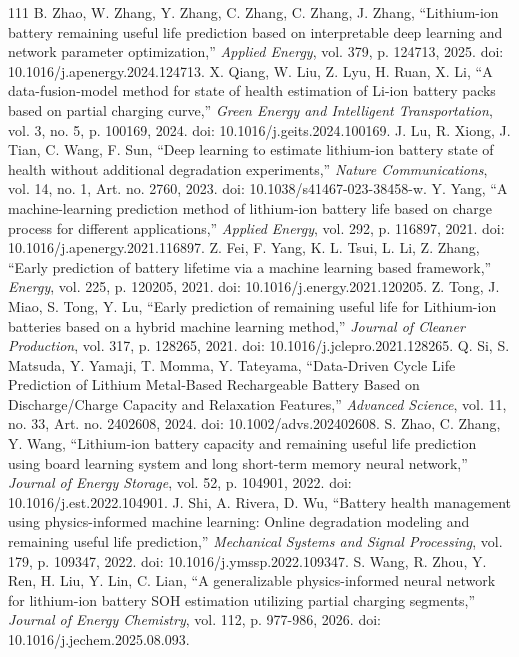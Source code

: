 \documentclass[journal]{IEEEtran}
\begin{document}
\begin{thebibliography}{111}
B. Zhao, W. Zhang, Y. Zhang, C. Zhang, C. Zhang, J. Zhang, ``Lithium-ion battery remaining useful life prediction based on interpretable deep learning and network parameter optimization,'' \emph{Applied Energy}, vol. 379, p. 124713, 2025. doi: 10.1016/j.apenergy.2024.124713.
X. Qiang, W. Liu, Z. Lyu, H. Ruan, X. Li, ``A data-fusion-model method for state of health estimation of Li-ion battery packs based on partial charging curve,'' \emph{Green Energy and Intelligent Transportation}, vol. 3, no. 5, p. 100169, 2024. doi: 10.1016/j.geits.2024.100169.
J. Lu, R. Xiong, J. Tian, C. Wang, F. Sun, ``Deep learning to estimate lithium-ion battery state of health without additional degradation experiments,'' \emph{Nature Communications}, vol. 14, no. 1, Art. no. 2760, 2023. doi: 10.1038/s41467-023-38458-w.
Y. Yang, ``A machine-learning prediction method of lithium-ion battery life based on charge process for different applications,'' \emph{Applied Energy}, vol. 292, p. 116897, 2021. doi: 10.1016/j.apenergy.2021.116897.
Z. Fei, F. Yang, K. L. Tsui, L. Li, Z. Zhang, ``Early prediction of battery lifetime via a machine learning based framework,'' \emph{Energy}, vol. 225, p. 120205, 2021. doi: 10.1016/j.energy.2021.120205.
Z. Tong, J. Miao, S. Tong, Y. Lu, ``Early prediction of remaining useful life for Lithium-ion batteries based on a hybrid machine learning method,'' \emph{Journal of Cleaner Production}, vol. 317, p. 128265, 2021. doi: 10.1016/j.jclepro.2021.128265.
Q. Si, S. Matsuda, Y. Yamaji, T. Momma, Y. Tateyama, ``Data‐Driven Cycle Life Prediction of Lithium Metal‐Based Rechargeable Battery Based on Discharge/Charge Capacity and Relaxation Features,'' \emph{Advanced Science}, vol. 11, no. 33, Art. no. 2402608, 2024. doi: 10.1002/advs.202402608.
S. Zhao, C. Zhang, Y. Wang, ``Lithium-ion battery capacity and remaining useful life prediction using board learning system and long short-term memory neural network,'' \emph{Journal of Energy Storage}, vol. 52, p. 104901, 2022. doi: 10.1016/j.est.2022.104901.
J. Shi, A. Rivera, D. Wu, ``Battery health management using physics-informed machine learning: Online degradation modeling and remaining useful life prediction,'' \emph{Mechanical Systems and Signal Processing}, vol. 179, p. 109347, 2022. doi: 10.1016/j.ymssp.2022.109347.
S. Wang, R. Zhou, Y. Ren, H. Liu, Y. Lin, C. Lian, ``A generalizable physics-informed neural network for lithium-ion battery SOH estimation utilizing partial charging segments,'' \emph{Journal of Energy Chemistry}, vol. 112, p. 977-986, 2026. doi: 10.1016/j.jechem.2025.08.093.

\end{thebibliography}
\end{document}

